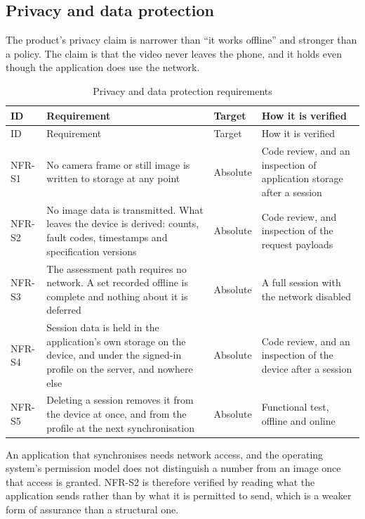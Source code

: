 \subsection{Privacy and data protection}
\label{sec:3.4.4}

The product's privacy claim is narrower than ``it works offline'' and stronger than a policy. The claim is that the video never leaves the phone, and it holds even though the application does use the network.

{\footnotesize
\setlength{\LTpre}{6pt}\setlength{\LTpost}{8pt}
\begin{longtable}{>{\raggedright\arraybackslash}p{}>{\raggedright\arraybackslash}p{}>{\raggedright\arraybackslash}p{}>{\raggedright\arraybackslash}p{}}
\caption{Privacy and data protection requirements}\\
\toprule
ID & Requirement & Target & How it is verified \\
\midrule
\endfirsthead
\toprule
ID & Requirement & Target & How it is verified \\
\midrule
\endhead
\bottomrule
\endfoot
\bottomrule
\endlastfoot
NFR-S1 & No camera frame or still image is written to storage at any point & Absolute & Code review, and an inspection of application storage after a session \\
NFR-S2 & No image data is transmitted. What leaves the device is derived: counts, fault codes, timestamps and specification versions & Absolute & Code review, and inspection of the request payloads \\
NFR-S3 & The assessment path requires no network. A set recorded offline is complete and nothing about it is deferred & Absolute & A full session with the network disabled \\
NFR-S4 & Session data is held in the application's own storage on the device, and under the signed-in profile on the server, and nowhere else & Absolute & Code review, and an inspection of the device after a session \\
NFR-S5 & Deleting a session removes it from the device at once, and from the profile at the next synchronisation & Absolute & Functional test, offline and online \\
\end{longtable}
}

An application that synchronises needs network access, and the operating system's permission model does not distinguish a number from an image once that access is granted. NFR-S2 is therefore verified by reading what the application sends rather than by what it is permitted to send, which is a weaker form of assurance than a structural one.

